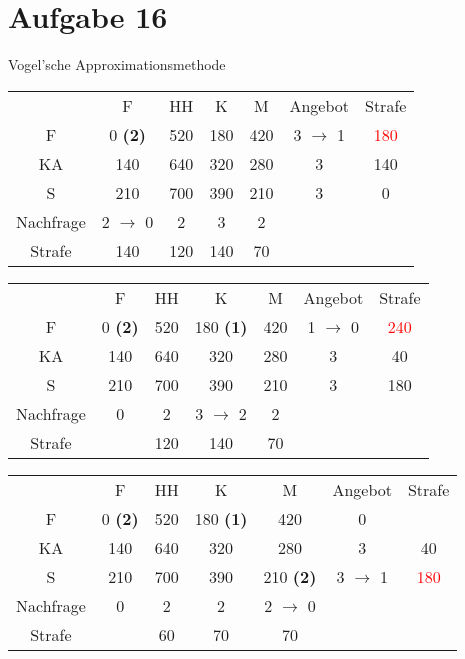 \documentclass{article}
\begin{document}
	\section*{Aufgabe 16}
	Vogel'sche Approximationsmethode
	\begin{center}
		\begin{tabular}{c|cccc|cc}
			& F & HH & K & M & Angebot & Strafe \\
			\cline{1-6}
			F & 0 \textbf{(2)} & 520 & 180 & 420 & 3 $\to$ 1 & \textcolor{red}{180} \\
			KA & 140 & 640 & 320 & 280 & 3 & 140 \\
			S & 210 & 700 & 390 & 210 & 3 & 0 \\
			\cline{1-6}
			Nachfrage & 2 $\to$ 0 & 2 & 3 & 2 & & \\
			Strafe & 140 & 120 & 140 & 70 & & 
		\end{tabular}
	\end{center}
	\begin{center}
		\begin{tabular}{c|cccc|cc}
			& \cellcolor{blue!30}F & HH & K & M & Angebot & Strafe \\
			\cline{1-6}
			F & \cellcolor{blue!30}0 \textbf{(2)} & 520 & 180 \textbf{(1)} & 420 & 1 $\to$ 0 & \textcolor{red}{240} \\
			KA & \cellcolor{blue!30}140 & 640 & 320 & 280 & 3 & 40 \\
			S & \cellcolor{blue!30}210 & 700 & 390 & 210 & 3 & 180 \\
			\cline{1-6}
			Nachfrage & \cellcolor{blue!30}0 & 2 & 3 $\to$ 2 & 2 & & \\
			Strafe & \cellcolor{blue!30} & 120 & 140 & 70 & & 
		\end{tabular}
	\end{center}
	\begin{center}
		\begin{tabular}{c|cccc|cc}
			& \cellcolor{blue!30}F & HH & K & M & Angebot & Strafe \\
			\cline{1-6}
			\rowcolor{blue!30}F & \cellcolor{blue!30}0 \textbf{(2)} & 520 & 180 \textbf{(1)} & 420 & 0 & \\
			KA & \cellcolor{blue!30}140 & 640 & 320 & 280 & 3 & 40 \\
			S & \cellcolor{blue!30}210 & 700 & 390 & 210 \textbf{(2)} & 3 $\to$ 1 & \textcolor{red}{180} \\
			\cline{1-6}
			Nachfrage & \cellcolor{blue!30}0 & 2 & 2 & 2 $\to$ 0 & & \\
			Strafe & \cellcolor{blue!30} & 60 & 70 & 70 & & 
		\end{tabular}
	\end{center}
\end{document}
